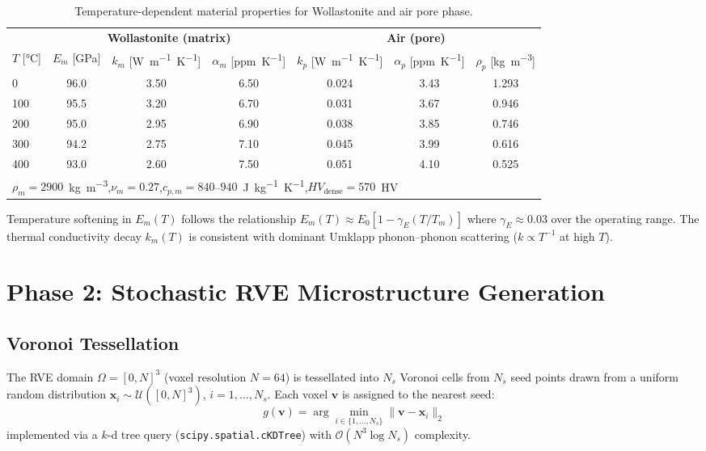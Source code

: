 \documentclass[11pt,a4paper]{article}
\begin{document}
\begin{table}[htbp]
\centering
\caption{Temperature-dependent material properties for Wollastonite and air pore phase.}
\label{tab:matprops}
\begin{tabular}{@{}lcccccc@{}}
\toprule
& \multicolumn{3}{c}{\textbf{Wollastonite (matrix)}} & \multicolumn{3}{c}{\textbf{Air (pore)}} \\
\cmidrule(lr){2-4}\cmidrule(lr){5-7}
$T$ [\si{\celsius}] & $E_m$ [\si{GPa}] & $k_m$ [\si{W.m^{-1}.K^{-1}}] & $\alpha_m$ [\si{ppm.K^{-1}}] & $k_p$ [\si{W.m^{-1}.K^{-1}}] & $\alpha_p$ [\si{ppm.K^{-1}}] & $\rho_p$ [\si{kg.m^{-3}}] \\
\midrule
0   & 96.0 & 3.50 & 6.50 & 0.024 & 3.43 & 1.293 \\
100 & 95.5 & 3.20 & 6.70 & 0.031 & 3.67 & 0.946 \\
200 & 95.0 & 2.95 & 6.90 & 0.038 & 3.85 & 0.746 \\
300 & 94.2 & 2.75 & 7.10 & 0.045 & 3.99 & 0.616 \\
400 & 93.0 & 2.60 & 7.50 & 0.051 & 4.10 & 0.525 \\
\midrule
\multicolumn{7}{l}{$\rho_m = 2900$~\si{kg.m^{-3}},\quad $\nu_m = 0.27$,\quad $c_{p,m} = 840$--$940$~\si{J.kg^{-1}.K^{-1}},\quad $HV_{\text{dense}} = 570$~HV} \\
\bottomrule
\end{tabular}
\end{table}

Temperature softening in $E_m(T)$ follows the relationship $E_m(T) \approx E_0[1 - \gamma_E(T/T_m)]$ where $\gamma_E \approx 0.03$ over the operating range. The thermal conductivity decay $k_m(T)$ is consistent with dominant Umklapp phonon--phonon scattering ($k \propto T^{-1}$ at high $T$).

\section{Phase 2: Stochastic RVE Microstructure Generation}
\label{sec:phase2}

\subsection{Voronoi Tessellation}

The RVE domain $\Omega = [0, N]^3$ (voxel resolution $N = 64$) is tessellated into $N_s$ Voronoi cells from $N_s$ seed points drawn from a uniform random distribution $\mathbf{x}_i \sim \mathcal{U}([0, N]^3)$, $i = 1, \ldots, N_s$. Each voxel $\mathbf{v}$ is assigned to the nearest seed:
\begin{equation}
    g(\mathbf{v}) = \arg\min_{i \in \{1,\ldots,N_s\}} \|\mathbf{v} - \mathbf{x}_i\|_2
\end{equation}
implemented via a $k$-d tree query (\texttt{scipy.spatial.cKDTree}) with $\mathcal{O}(N^3 \log N_s)$ complexity.
\end{document}
